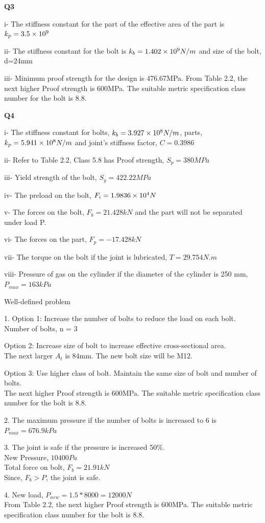 \documentclass[a4paper, fleqn]{article}
\providecommand{\sci}[1]{\protect\ensuremath{\times 10^{\StrSubstitute[0]{#1}{e}{}}}}
\begin{document}
\vspace{10pt}
\textbf{Q3}

i- The stiffness constant for the part of the effective area of the part is $k_p=3.5\sci{e9}$

ii- The stiffness constant for the bolt is $k_b=1.402\sci{e9}N/m$ and size of the bolt, d=24mm

iii- Minimum proof strength for the design is 476.67MPa.
From Table 2.2, the next higher Proof strength is 600MPa. The suitable metric specification class number for the bolt is 8.8.

\vspace{10pt}
\textbf{Q4}


i- The stiffness constant for bolts, $k_b=3.927\sci{e8}N/m$, parts, $k_p=5.941\sci{e8}N/m$ and joint’s stiffness factor, $C=0.3986$

ii- Refer to Table 2.2, Class 5.8 has Proof strength, $S_p=380MPa$

iii- Yield strength of the bolt, $S_y=422.22MPa$

iv- The preload on the bolt, $F_i=1.9836\sci{e4}N$

v- The forces on the bolt, $F_b=21.428kN$ and the part will not be separated under load P.

vi- The forces on the part, $F_p=-17.428kN$

vii- The torque on the bolt if the joint is lubricated, $T=29.754N.m$

viii- Pressure of gas on the cylinder if the diameter of the cylinder is 250 mm, $P_{max}=163kPa$

\vspace{10pt}
Well-defined problem

1. Option 1: Increase the number of bolts to reduce the load on each bolt.
Number of bolts, n = 3

Option 2: Increase size of bolt to increase effective cross-sectional area. \\
The next larger $A_t$ is 84mm. The new bolt size will be M12.

Option 3: Use higher class of bolt. Maintain the same size of bolt and number of bolts. \\
The next higher Proof strength is 600MPa. The suitable metric specification class number for the bolt is 8.8.

2. The maximum pressure if the number of bolts is increased to 6 is $P_{max}=676.9kPa$

3. The joint is safe if the pressure is increased 50\%. \\
New Pressure, $10400Pa$ \\
Total force on bolt, $F_b=21.91kN$ \\
Since, $F_b >P$, the joint is safe.

4. New load, $P_{new}=1.5*8000=12000N$ \\
From Table 2.2, the next higher Proof strength is 600MPa.
The suitable metric specification class number for the bolt is 8.8.
\end{document}
